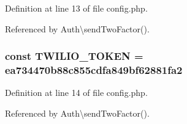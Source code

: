 Definition at line 13 of file config.\+php.



Referenced by Auth\textbackslash{}send\+Two\+Factor().

\hypertarget{config_8php_a0477d5c66524299f08cae7376eb7884c}{}
\subsubsection[{T\+W\+I\+L\+I\+O\+\_\+\+T\+O\+K\+E\+N}]{\setlength{\rightskip}{0pt plus 5cm}const T\+W\+I\+L\+I\+O\+\_\+\+T\+O\+K\+E\+N = \textquotesingle{}ea734470b88c855cdfa849bf62881fa2\textquotesingle{}}\label{config_8php_a0477d5c66524299f08cae7376eb7884c}


Definition at line 14 of file config.\+php.



Referenced by Auth\textbackslash{}send\+Two\+Factor().

